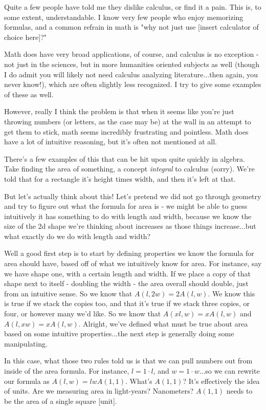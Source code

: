 Quite a few people have told me they dislike calculus, or find it a pain. This is, to some extent, understandable. I know very few people who enjoy memorizing formulas, and a common refrain in math is "why not just use [insert calculator of choice here]?" 

Math does have very broad applications, of course, and calculus is no exception - not just in the sciences, but in more humanities oriented subjects as well (though I do admit you will likely not need calculus analyzing literature...then again, you never know!), which are often slightly less recognized. I try to give some examples of these as well.

However, really I think the problem is that when it seems like you're just throwing numbers (or letters, as the case may be) at the wall in an attempt to get them to stick, math seems incredibly frustrating and pointless. Math does have a lot of intuitive reasoning, but it's often not mentioned at all.

There's a few examples of this that can be hit upon quite quickly in algebra. Take finding the area of something, a concept \textit{integral} to calculus (sorry). We're told that for a rectangle it's height times width, and then it's left at that.

But let's actually think about this! Let's pretend we did not go through geometry and try to figure out what the formula for area is - we might be able to guess intuitively it has something to do with length and width, because we know the size of the 2d shape we're thinking about increases as those things increase...but what exactly do we do with length and width?

Well a good first step is to start by defining properties we know the formula for area should have, based off of what we intuitively know for area. For instance, say we have shape one, with a certain length and width. If we place a copy of that shape next to itself - doubling the width - the area overall should double, just from an intuitive sense. So we know that $A(l, 2w) = 2 A(l, w)$. We know this is true if we stack the copies too, and that it's true if we stack three copies, or four, or however many we'd like. So we know that $A(x l, w) = x A(l, w)$ and $A(l, xw) = x A(l,w)$. Alright, we've defined what must be true about area based on some intuitive properties...the next step is generally doing some manipulating.

In this case, what those two rules told us is that we can pull numbers out from inside of the area formula. For instance, $l = 1\cdot l$, and $w = 1\cdot w$...so we can rewrite our formula as $A(l,w) = lwA(1,1)$. What's $A(1,1)$? It's effectively the idea of units. Are we measuring area in light-years? Nanometers? $A(1,1)$ needs to be the area of a single square [unit].

